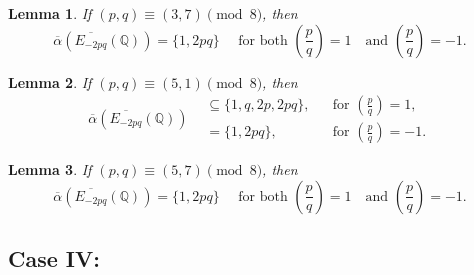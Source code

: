 \documentclass[12pt]{amsart}
\newcommand{\bbQ}{\mathbb{Q}}
\newcommand{\legendre}[2]{\genfrac{(}{)}{}{}{#1}{#2}}
\numberwithin{equation}{section}
\newtheorem{lem}{Lemma}[section]
\theoremstyle{definition}
\begin{document}


\begin{lem}
\label{lem:oalpha_3.2}
If $(p,q)\equiv (3,7)\pmod 8$, then
\[
\overline{\alpha}\left(\overline{E_{-2pq}}(\bbQ)\right)
= \{1,2pq\}\quad \text{ for both } \legendre{p}{q}=1 \quad \text{and } \legendre{p}{q}=-1.
\]
\end{lem}



\begin{lem}
\label{lem:oalpha_3.3}
If $(p,q)\equiv (5,1)\pmod 8$, then
\[
\overline{\alpha}\left(\overline{E_{-2pq}}(\bbQ)\right)
\begin{aligned}
&\subseteq \{1,q,2p,2pq\},
&& \text{for } \legendre{p}{q}=1,\\
&= \{1,2pq\},
&& \text{for } \legendre{p}{q}=-1.
\end{aligned}
\]
\end{lem}



\begin{lem}
\label{lem:oalpha_3.4}
If $(p,q)\equiv (5,7)\pmod 8$, then
\[
\overline{\alpha}\left(\overline{E_{-2pq}}(\bbQ)\right)
= \{1,2pq\} \quad \text{ for both } \legendre{p}{q}=1 \quad \text{and } \legendre{p}{q}=-1.
\]
\end{lem}





\subsection*{Case IV:}



\end{document}
